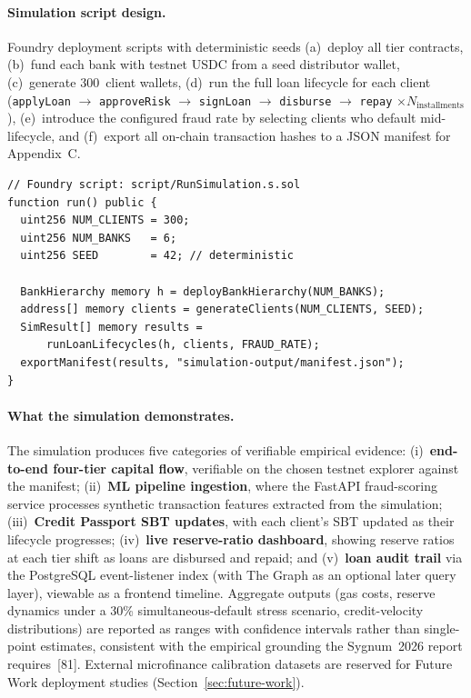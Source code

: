\documentclass[12pt,a4paper]{report}
\begin{document}
\paragraph{Simulation script design.}
Foundry deployment scripts with deterministic seeds (a)~deploy all tier contracts, (b)~fund each bank with testnet USDC from a seed distributor wallet, (c)~generate 300~client wallets, (d)~run the full loan lifecycle for each client (\texttt{applyLoan} $\to$ \texttt{approveRisk} $\to$ \texttt{signLoan} $\to$ \texttt{disburse} $\to$ \texttt{repay} $\times N_\text{installments}$), (e)~introduce the configured fraud rate by selecting clients who default mid-lifecycle, and (f)~export all on-chain transaction hashes to a JSON manifest for Appendix~C.

\begin{lstlisting}[language=Solidity, caption={Foundry simulation entry-point (structure)}]
// Foundry script: script/RunSimulation.s.sol
function run() public {
  uint256 NUM_CLIENTS = 300;
  uint256 NUM_BANKS   = 6;
  uint256 SEED        = 42; // deterministic

  BankHierarchy memory h = deployBankHierarchy(NUM_BANKS);
  address[] memory clients = generateClients(NUM_CLIENTS, SEED);
  SimResult[] memory results =
      runLoanLifecycles(h, clients, FRAUD_RATE);
  exportManifest(results, "simulation-output/manifest.json");
}
\end{lstlisting}

\paragraph{What the simulation demonstrates.}
The simulation produces five categories of verifiable empirical evidence: (i)~\textbf{end-to-end four-tier capital flow}, verifiable on the chosen testnet explorer against the manifest; (ii)~\textbf{ML pipeline ingestion}, where the FastAPI fraud-scoring service processes synthetic transaction features extracted from the simulation; (iii)~\textbf{Credit Passport SBT updates}, with each client's SBT updated as their lifecycle progresses; (iv)~\textbf{live reserve-ratio dashboard}, showing reserve ratios at each tier shift as loans are disbursed and repaid; and (v)~\textbf{loan audit trail} via the PostgreSQL event-listener index (with The Graph as an optional later query layer), viewable as a frontend timeline. Aggregate outputs (gas costs, reserve dynamics under a 30\% simultaneous-default stress scenario, credit-velocity distributions) are reported as ranges with confidence intervals rather than single-point estimates, consistent with the empirical grounding the Sygnum~2026 report requires~[81]. External microfinance calibration datasets are reserved for Future Work deployment studies (Section~\ref{sec:future-work}).
\end{document}

